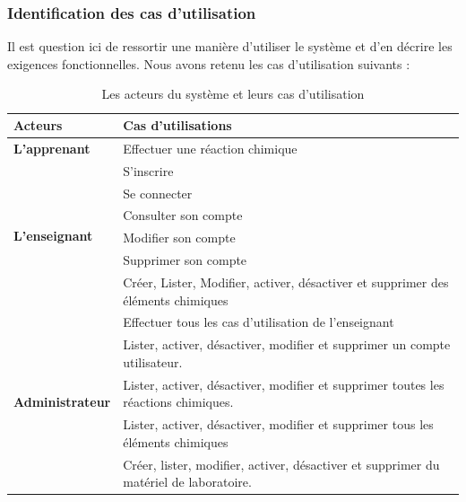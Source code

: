 \subsubsection{Identification des cas d’utilisation}

Il est question ici de ressortir une manière d’utiliser le système et d’en décrire les exigences fonctionnelles. Nous avons retenu les cas d’utilisation suivants :

\begin{table}[H]
	\centering
	\caption{Les acteurs du système et leurs cas d'utilisation}
	\label{tab:my-table}
	\begin{tabular}{|l|p{10cm}|}
		\hline
		\textbf{Acteurs}                         & \textbf{Cas d’utilisations}                                                           \\ \hline
		\textbf{L’apprenant}                     & Effectuer une réaction chimique                                                       \\ \hline
		\multirow{6}{*}{\textbf{L’enseignant}}   & S’inscrire                                                                            \\ \cline{2-2}
		                                         & Se connecter                                                                          \\ \cline{2-2}
		                                         & Consulter son compte                                                                  \\ \cline{2-2}
		                                         & Modifier son compte                                                                   \\ \cline{2-2}
		                                         & Supprimer son compte                                                                  \\ \cline{2-2}
		                                         & Créer, Lister, Modifier, activer, désactiver et supprimer des éléments chimiques      \\ \hline
		\multirow{5}{*}{\textbf{Administrateur}} & Effectuer tous les cas d’utilisation de l’enseignant                                  \\ \cline{2-2}
		                                         & Lister, activer, désactiver, modifier et supprimer un compte utilisateur.             \\ \cline{2-2}
		                                         & Lister, activer, désactiver, modifier et supprimer toutes les réactions chimiques.    \\ \cline{2-2}
		                                         & Lister, activer, désactiver, modifier et supprimer tous les éléments chimiques        \\ \cline{2-2}
		                                         & Créer, lister, modifier, activer, désactiver et supprimer du matériel de laboratoire. \\ \hline
	\end{tabular}
\end{table}

